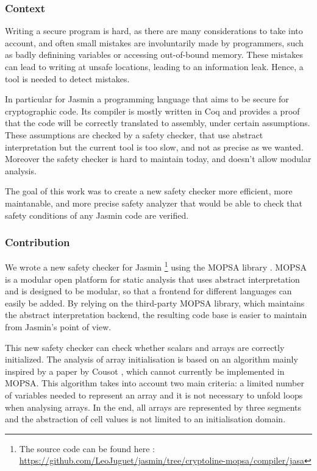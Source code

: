 \documentclass[runningheads]{llncs}
\begin{document}
\subsubsection{Context} 
Writing a secure program is hard, as there are many considerations to take into 
account, and often small mistakes are 
involuntarily made by programmers, such as badly definining variables or 
accessing out-of-bound memory. These mistakes 
can lead to writing at unsafe locations, leading to an information leak. 
Hence, a tool is needed to detect mistakes.

In particular for Jasmin \cite{jasmin} a programming language that aims 
to be secure for cryptographic code.
Its compiler is mostly written in Coq and provides a proof that the code will be 
correctly translated to assembly, under certain assumptions.
These assumptions are checked by a safety checker,
that use abstract interpretation \cite{cousot-lattice}
 but the current tool is too slow, and not as precise as we wanted. Moreover
the safety checker is hard to maintain today, and doesn't allow modular analysis.

The goal of this work was to create a new safety checker
more efficient, more maintanable, and 
more precise safety analyzer that would be able to check that safety conditions of 
any Jasmin code are verified.


\subsubsection{Contribution}
We wrote a new safety checker for Jasmin 
\footnote{The source code can be found here : \url{https://github.com/LeoJuguet/jasmin/tree/cryptoline-mopsa/compiler/jasa}}\cite{jasmin} 
using the MOPSA \cite{mopsa-phd} library . 
MOPSA\cite{mopsa-phd} 
is a modular open platform for static analysis that uses abstract interpretation 
and is designed to be modular, 
so that a frontend for different languages can easily be added. By relying on 
the third-party MOPSA library, which maintains the abstract interpretation 
backend, the resulting code base is easier to maintain from Jasmin's point 
of view.




This new safety checker can check whether scalars and arrays are 
correctly initialized. The analysis of array initialisation is based on 
an algorithm mainly inspired by a paper by Cousot \cite{cousot-article}, 
which cannot 
currently be implemented in MOPSA. This algorithm takes into account 
two main criteria: a limited number of variables needed to represent 
an array and it is not necessary to unfold loops when analysing arrays. In the 
end, all arrays are represented by three segments and the abstraction 
of cell values is not limited to an initialisation domain.
\end{document}
